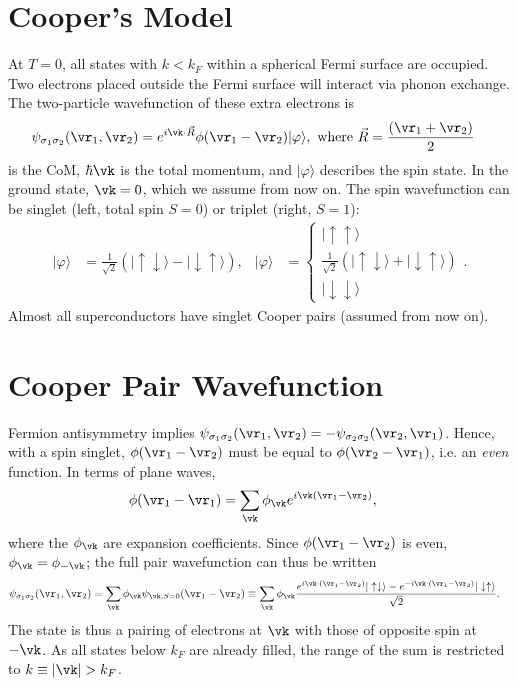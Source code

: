 \documentclass[a4paper, 11pt, normalem]{report}
\begin{document}
\section{Cooper's Model}
At $T=0$, all states with $k<k_F$ within a spherical Fermi surface are occupied.
Two electrons placed outside the Fermi surface will interact via phonon exchange.
The two-particle wavefunction of these extra electrons is
\begin{align}
    \psi_{\sigma_1\sigma_2}(\vr_1,\vr_2) &= e^{i\vk\cdot\vec{R}}\phi(\vr_1-\vr_2)|\varphi\rangle, \text{ where } \vec{R} = \frac{(\vr_1+\vr_2)}{2}
\end{align}
is the CoM, $\hbar\vk$ is the total momentum, and $|\varphi\rangle$ describes the spin state.
In the ground state, $\vk=0$, which we assume from now on.
The spin wavefunction can be singlet (left, total spin $S=0$) or triplet (right, $S=1$):
\begin{align}
    |\varphi\rangle &= \frac{1}{\sqrt{2}}\left(|\uparrow\downarrow\rangle-|\downarrow\uparrow\rangle\right), & |\varphi\rangle &= \begin{cases} |\uparrow\uparrow\rangle \\ \frac{1}{\sqrt{2}}\left(|\uparrow\downarrow\rangle+|\downarrow\uparrow\rangle\right) \\ |\downarrow\downarrow\rangle \end{cases}.
\end{align}
Almost all superconductors have singlet Cooper pairs (assumed from now on).

\section{Cooper Pair Wavefunction}
Fermion antisymmetry implies $\psi_{\sigma_1\sigma_2}(\vr_1,\vr_2)=-\psi_{\sigma_2\sigma_2}(\vr_2,\vr_1)$.
Hence, with a spin singlet, $\phi(\vr_1-\vr_2)$ must be equal to $\phi(\vr_2-\vr_1)$, i.e. an \emph{even} function.
In terms of plane waves,
\begin{align}
    \phi(\vr_1-\vr_1) &= \sum_{\vk}\phi_{\vk}e^{i\vk(\vr_1-\vr_2)},
\end{align}
where the $\phi_{\vk}$ are expansion coefficients.
Since $\phi(\vr_1-\vr_2)$ is even, $\phi_{\vk}=\phi_{-\vk}$; the full pair wavefunction can thus be written
\begin{align}
    \psi_{\sigma_1\sigma_2}(\vr_1,\vr_2) &= \sum_{\vk}\phi_{\vk}\psi_{\vk,S=0}(\vr_1-\vr_2) \equiv \sum_{\vk} \phi_{\vk}\frac{e^{i\vk\cdot(\vr_1-\vr_2)}|\uparrow\downarrow\rangle-e^{-i\vk\cdot(\vr_1-\vr_2)}|\downarrow\uparrow\rangle}{\sqrt{2}}.
\end{align}
The state is thus a pairing of electrons at $\vk$ with those of opposite spin at $-\vk$.
As all states below $k_F$ are already filled, the range of the sum is restricted to $k\equiv|\vk|>k_F$.
\end{document}
